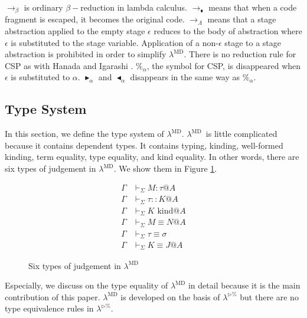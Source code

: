 \documentclass[runningheads]{llncs}
\newcommand{\LTP}{$\lambda^{\triangleright\%}$\xspace}
\newcommand{\LMD}{$\lambda^{\textrm{MD}}$\xspace}
\newcommand{\G}{\Gamma}
\newcommand{\V}{\vdash_\Sigma}
\newcommand{\iskind}{\text{\ kind}}
\newcommand{\TB}{{\mathop{\blacktriangleright}}}
\newcommand{\TBL}{{\mathop{\blacktriangleleft}}}
\newcommand{\E}{\equiv}
\begin{document}
  $\longrightarrow_\beta$ is ordinary $\beta-$reduction in lambda calculus.
  $\longrightarrow_\blacklozenge$ means that when a code fragment is escaped, it becomes the original code.
  $\longrightarrow_\Lambda$ means that a stage abstraction applied to the empty stage $\epsilon$ reduces to the body of abstraction
  where $\epsilon$ is substituted to the stage variable.
  Application of a non-$\epsilon$ stage to a stage abstraction is prohibited in order to simplify \LMD.
  There is no reduction rule for CSP as with Hanada and Igarashi \cite{Hanada2014}.
  $\%_\alpha$, the symbol for CSP, is disappeared when $\epsilon$ is substituted to $\alpha$.
  $\TB_\alpha$ and $\TBL_\alpha$ disappears in the same way as $\%_\alpha$.

  \subsection{Type System}


  In this section, we define the type system of \LMD.
  \LMD\ is little complicated because it contains dependent types.
  It contains typing, kinding, well-formed kinding, term equality, type equality, and kind equality.
  In other words, there are six types of judgement in \LMD.
  We show them in Figure \ref{fig:LMD-six-judgements}.

  \begin{figure}
      \begin{center}
          \begin{align*}
              \G & \V M : \tau @ A   \\
              \G & \V \tau :: K @ A  \\
              \G & \V K \iskind @ A  \\
              \G & \V M \E N @ A     \\
              \G & \V \tau \E \sigma \\
              \G & \V K \E J @ A     
          \end{align*}
          \caption{Six types of judgement in \LMD}
          \label{fig:LMD-six-judgements}
      \end{center}
  \end{figure}

  Especially, we discuss on the type equality of \LMD in detail
  because it is the main contribution of this paper.
  \LMD is developed on the basis of \LTP but there are no type equivalence rules in \LTP.
\end{document}
